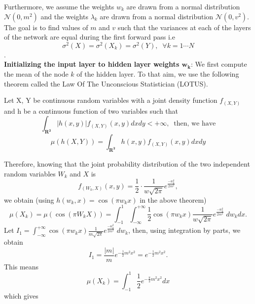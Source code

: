 \documentclass[AMS,STIX1COL]{WileyNJD-v2}
\begin{document}
 


Furthermore, we assume the weights $w_k$ are drawn from a normal distribution $\mathcal N(0, m^2)$ and the weights $\lambda_k$ are drawn from a normal distribution $\mathcal N(0, v^2)$. The goal is to find values of $m$ and $v$ such that the variances at each of the layers of the network are equal during the first forward pass i.e $$\sigma^2(X) = \sigma^2(X_k) = \sigma^2(Y),\; \; \forall k=1\cdots N$$.\\
\textbf{Initializing the input layer to hidden layer weights  $\mathbf{w_k}$}: 
    We first compute the mean of the node $k$ of the hidden layer. To that aim, we use the following theorem called the Law Of The Unconscious Statistician (LOTUS).
\begin{theorem}
Let X, Y be continuous random variables with a joint density function $f_{(X,Y)}$ and h be a continuous function of two variables such that
$$\int_{\mathbf{R^2}} |h(x,y)| f_{(X,Y)}(x,y) dx dy < +\infty,\;\; \text{then, we have}$$
$$\mu\left(h(X,Y)\right) = \int_{\mathbf{R^2}} h(x,y) f_{(X,Y)}(x,y) dx dy  $$
\end{theorem}

Therefore, knowing that the joint probability distribution of the two independent random variables $W_k$ and $X$ is $$f_{(W_k,X)}(x,y) = \frac{1}{2} \cdot \frac{1}{w \sqrt{2\pi}} e^{\frac{-w_k^2}{2m^2}},$$ we obtain (using $h(w_k,x) = \cos(\pi w_k x)$ in the above theorem) 
\begin{equation}\label{Eq:muxk}
    \mu(X_k) = \mu(\cos(\pi W_k X)) = \int_{-1}^{1} \int_{-\infty}^{+\infty}\frac{1}{2} \cos(\pi w_k x)\frac{1}{w \sqrt{2\pi}} e^{\frac{-w_k^2}{2m^2}}\; dw_k dx.
\end{equation}
Let $I_1 = \int_{-\infty}^{+\infty} \cos(\pi w_k x)\frac{1}{m \sqrt{2\pi}} e^{\frac{-w_k^2}{2m^2}}\; dw_k$, then, using integration by parts, we obtain
$$I_1 = \frac{|m|}{m}e^{-\frac{1}{2}m^2x^2} = e^{-\frac{1}{2}m^2x^2}. $$
This means
$$ \mu(X_k) = \int_{-1}^{1}\frac{1}{2} e^{-\frac{\pi}{2}m^2x^2} dx $$
which gives
\end{document}
